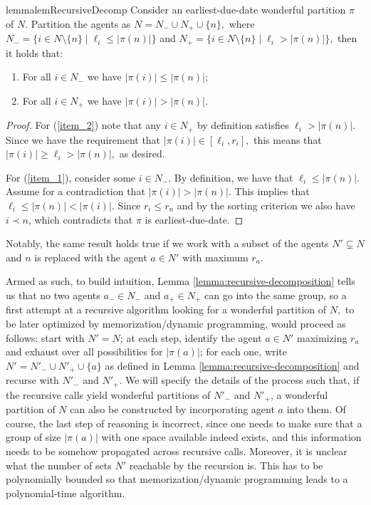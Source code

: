 \documentclass[a4paper]{article}
\newcommand{\set}[1]{\{#1\}}
\newcommand{\modulus}[1]{\vert #1 \vert}
\begin{document}
\begin{restatable}{lemma}{lemRecursiveDecomp} \label{lemma:recursive-decomposition} Consider an earliest-due-date wonderful partition $\pi$ of $N.$ Partition the agents as $N = N_{-} \cup N_{+} \cup \{n\},$ where $N_{-} = \set{i \in N \setminus \{n\} \mid \ell_i \leq \modulus{\pi(n)}}$ and $N_{+} = \set{i \in N \setminus \{n\} \mid \ell_i > \modulus{\pi(n)}},$ then it holds that:

\begin{enumerate}
    \item  \label{item_1} For all $i \in N_{-}$ we have $\modulus{\pi(i)} \leq \modulus{\pi(n)}$;
    \item \label{item_2} For all $i \in N_{+}$ we have $\modulus{\pi(i)} > \modulus{\pi(n)}.$
\end{enumerate}%
\end{restatable}
\begin{proof} For (\ref{item_2}) note that any $i \in N_{+}$ by definition satisfies $\ell_i > \modulus{\pi(n)}.$ Since we have the requirement that $\modulus{\pi(i)} \in [\ell_i, r_i],$ this means that $\modulus{\pi(i)} \geq \ell_i > \modulus{\pi(n)},$ as desired.

For (\ref{item_1}), consider some $i \in N_{-}.$ By definition, we have that $\ell_i \leq \modulus{\pi(n)}.$ Assume for a contradiction that $\modulus{\pi(i)} > \modulus{\pi(n)}.$ This implies that $\ell_i \leq \modulus{\pi(n)} < \modulus{\pi(i)}.$ Since $r_i \leq r_n$ and by the sorting criterion we also have $i \prec n$, which contradicts that $\pi$ is earliest-due-date.
\end{proof}

\noindent Notably, the same result holds true if we work with a subset of the agents $N' \subsetneq N$ and $n$ is replaced with the agent $a \in N'$ with maximum $r_a.$

Armed as such, to build intuition, Lemma \ref{lemma:recursive-decomposition} tells us that no two agents $a_{-} \in N_{-}$ and $a_{+} \in N_{+}$ can go into the same group, so a first attempt at a recursive algorithm looking for a wonderful partition of $N,$  to be later optimized by memorization/dynamic programming, would proceed as follows: start with $N' = N$; at each step, identify the agent $a \in N'$ maximizing $r_a$ and exhaust over all possibilities for $\modulus{\pi(a)}$; for each one, write $N' = N'_{-} \cup N'_{+} \cup \{a\}$ as defined in Lemma \ref{lemma:recursive-decomposition} and recurse with $N'_{-}$ and $N'_{+}$. We will specify the details of the process such that, if the recursive calls yield wonderful partitions of $N'_{-}$ and $N'_{+}$, a wonderful partition of $N$ can also be constructed by incorporating agent $a$ into them.
Of course, the last step of reasoning is incorrect, since one needs to make sure that a group of size $\modulus{\pi(a)}$ with one space available indeed exists, and this information needs to be somehow propagated across recursive calls. Moreover, it is unclear what the number of sets $N'$ reachable by the recursion is. This has to be polynomially bounded so that memorization/dynamic programming leads to a polynomial-time algorithm.
\end{document}
